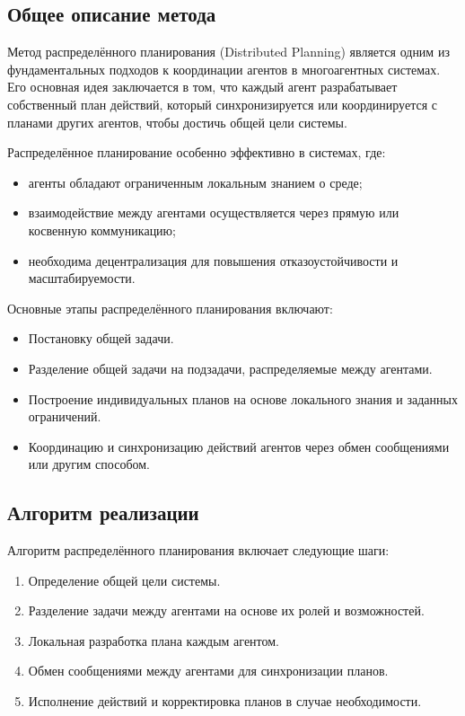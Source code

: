 \subsection{Общее описание метода}

Метод распределённого планирования (Distributed Planning) является одним из фундаментальных подходов к координации агентов в многоагентных системах. Его основная идея заключается в том, что каждый агент разрабатывает собственный план действий, который синхронизируется или координируется с планами других агентов, чтобы достичь общей цели системы.

Распределённое планирование особенно эффективно в системах, где:
\begin{itemize}
	\item агенты обладают ограниченным локальным знанием о среде;
	\item взаимодействие между агентами осуществляется через прямую или косвенную коммуникацию;
	\item необходима децентрализация для повышения отказоустойчивости и масштабируемости.
\end{itemize}

Основные этапы распределённого планирования включают:
\begin{itemize}
	\item Постановку общей задачи.
	\item Разделение общей задачи на подзадачи, распределяемые между агентами.
	\item Построение индивидуальных планов на основе локального знания и заданных ограничений.
	\item Координацию и синхронизацию действий агентов через обмен сообщениями или другим способом.
\end{itemize}

\subsection{Алгоритм реализации}

Алгоритм распределённого планирования включает следующие шаги:
\begin{enumerate}
	\item Определение общей цели системы.
	\item Разделение задачи между агентами на основе их ролей и возможностей.
	\item Локальная разработка плана каждым агентом.
	\item Обмен сообщениями между агентами для синхронизации планов.
	\item Исполнение действий и корректировка планов в случае необходимости.
\end{enumerate}

